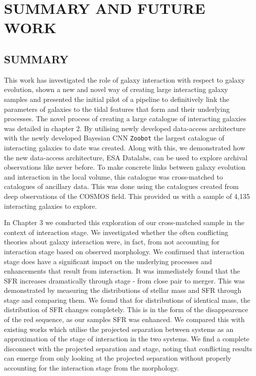 \chapter{SUMMARY AND FUTURE WORK}
\section{SUMMARY}
\noindent This work has investigated the role of galaxy interaction with respect to galaxy evolution, shown a new and novel way of creating large interacting galaxy samples and presented the initial pilot of a pipeline to definitively link the parameters of galaxies to the tidal features that form and their underlying processes. The novel process of creating a large catalogue of interacting galaxies was detailed in chapter 2. By utilising newly developed data-access architecture with the newly developed Bayesian CNN \texttt{Zoobot} the largest catalogue of interacting galaxies to date was created. Along with this, we demonstrated how the new data-access architecture, ESA Datalabs, can be used to explore archival observations like never before. To make concrete links between galaxy evolution and interaction in the local volume, this catalogue was cross-matched to catalogues of ancillary data. This was done using the catalogues created from deep observations of the COSMOS field. This provided us with a sample of 4,135 interacting galaxies to explore.

In Chapter 3 we conducted this exploration of our cross-matched sample in the context of interaction stage. We investigated whether the often conflicting theories about galaxy interaction were, in fact, from not accounting for interaction stage based on observed morphology. We confirmed that interaction stage does have a significant impact on the underlying processes and enhancements that result from interaction. It was immediately found that the SFR increases dramatically through stage - from close pair to merger. This was demonstrated by measuring the distributions of stellar mass and SFR through stage and comparing them. We found that for distributions of identical mass, the distribution of SFR changes completely. This is in the form of the disappearence of the red sequence, as our samples SFR was enhanced. We compared this with existing works which utilise the projected separation between systems as an approximation of the stage of interaction in the two systems. We find a complete disconnect with the projected separation and stage, noting that conflicting results can emerge from only looking at the projected separation without properly accounting for the interaction stage from the morphology. 

